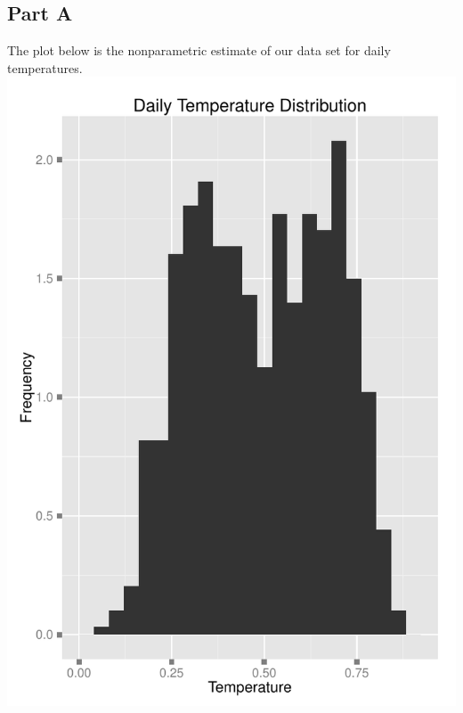 \documentclass[11pt]{article}
\begin{document}
\subsection{Part A}
The plot below is the nonparametric estimate of our data set for daily temperatures. 
\newline
\label{sec:problem3aplot}
\includegraphics{Problem3A.pdf}
\newline
\pagebreak
\end{document}
